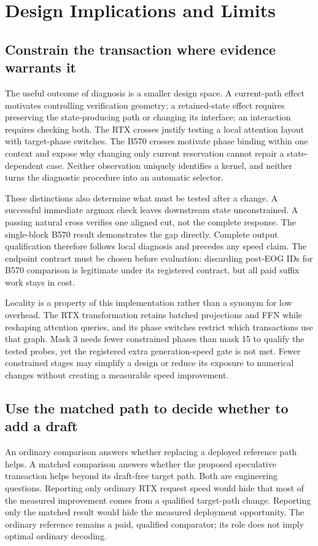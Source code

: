 \section{Design Implications and Limits}
\label{sec:implications}
\subsection{Constrain the transaction where evidence warrants it}
The useful outcome of diagnosis is a smaller design space. A current-path effect motivates controlling verification geometry; a retained-state effect requires preserving the state-producing path or changing its interface; an interaction requires checking both. The RTX crosses justify testing a local attention layout with target-phase switches. The B570 crosses motivate phase binding within one context and expose why changing only current reservation cannot repair a state-dependent case. Neither observation uniquely identifies a kernel, and neither turns the diagnostic procedure into an automatic selector.

These distinctions also determine what must be tested after a change. A successful immediate argmax check leaves downstream state unconstrained. A passing natural cross verifies one aligned cut, not the complete response. The single-block B570 result demonstrates the gap directly. Complete output qualification therefore follows local diagnosis and precedes any speed claim. The endpoint contract must be chosen before evaluation: discarding post-EOG IDs for B570 comparison is legitimate under its registered contract, but all paid suffix work stays in cost.

Locality is a property of this implementation rather than a synonym for low overhead. The RTX transformation retains batched projections and FFN while reshaping attention queries, and its phase switches restrict which transactions use that graph. Mask 3 needs fewer constrained phases than mask 15 to qualify the tested probes, yet the registered extra generation-speed gate is not met. Fewer constrained stages may simplify a design or reduce its exposure to numerical changes without creating a measurable speed improvement.

\subsection{Use the matched path to decide whether to add a draft}
An ordinary comparison answers whether replacing a deployed reference path helps. A matched comparison answers whether the proposed speculative transaction helps beyond its draft-free target path. Both are engineering questions. Reporting only ordinary RTX request speed would hide that most of the measured improvement comes from a qualified target-path change. Reporting only the matched result would hide the measured deployment opportunity. The ordinary reference remains a paid, qualified comparator; its role does not imply optimal ordinary decoding.


